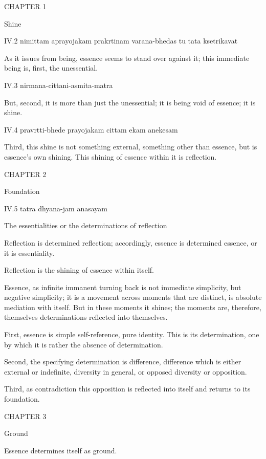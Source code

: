 CHAPTER 1

Shine

IV.2
nimittam aprayojakam prakrtinam varana-bhedas tu tata ksetrikavat

As it issues from being, essence seems to stand over against it;
this immediate being is, first, the unessential.

IV.3
nirmana-cittani-asmita-matra

But, second, it is more than just the unessential;
it is being void of essence; it is shine.

IV.4
pravrtti-bhede prayojakam cittam ekam anekesam

Third, this shine is not something external,
something other than essence, but is essence's own shining.
This shining of essence within it is reflection.

CHAPTER 2

Foundation

IV.5
tatra dhyana-jam anasayam

The essentialities or the determinations of reflection

Reflection is determined reflection;
accordingly, essence is determined essence, or it is essentiality.

Reflection is the shining of essence within itself.

Essence, as infinite immanent turning back is
not immediate simplicity, but negative simplicity;
it is a movement across moments that are distinct,
is absolute mediation with itself.
But in these moments it shines;
the moments are, therefore, themselves
determinations reflected into themselves.

First, essence is simple self-reference, pure identity.
This is its determination, one by which it is rather
the absence of determination.

Second, the specifying determination is difference,
difference which is either external or indefinite,
diversity in general, or opposed diversity or opposition.

Third, as contradiction this opposition is reflected into itself
and returns to its foundation.

CHAPTER 3

Ground

Essence determines itself as ground.

